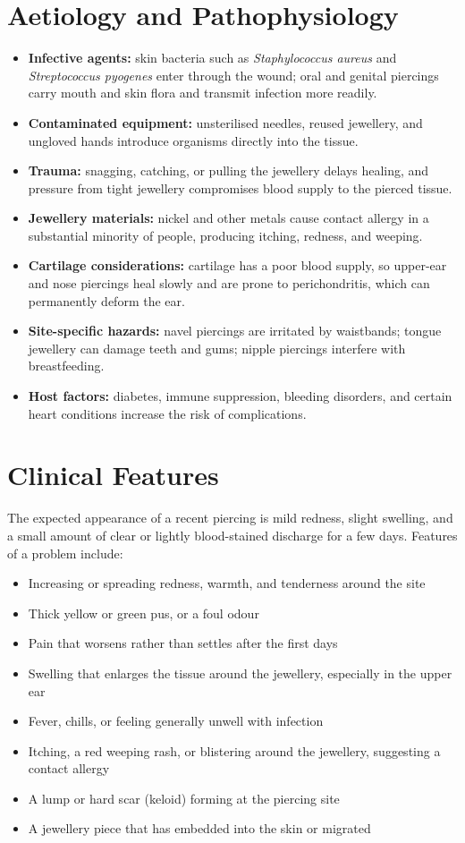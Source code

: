 \section*{Aetiology and Pathophysiology}
\begin{itemize}
    \item \textbf{Infective agents:} skin bacteria such as \textit{Staphylococcus aureus} and \textit{Streptococcus pyogenes} enter through the wound; oral and genital piercings carry mouth and skin flora and transmit infection more readily.
    \item \textbf{Contaminated equipment:} unsterilised needles, reused jewellery, and ungloved hands introduce organisms directly into the tissue.
    \item \textbf{Trauma:} snagging, catching, or pulling the jewellery delays healing, and pressure from tight jewellery compromises blood supply to the pierced tissue.
    \item \textbf{Jewellery materials:} nickel and other metals cause contact allergy in a substantial minority of people, producing itching, redness, and weeping.
    \item \textbf{Cartilage considerations:} cartilage has a poor blood supply, so upper-ear and nose piercings heal slowly and are prone to perichondritis, which can permanently deform the ear.
    \item \textbf{Site-specific hazards:} navel piercings are irritated by waistbands; tongue jewellery can damage teeth and gums; nipple piercings interfere with breastfeeding.
    \item \textbf{Host factors:} diabetes, immune suppression, bleeding disorders, and certain heart conditions increase the risk of complications.
\end{itemize}

\section*{Clinical Features}
The expected appearance of a recent piercing is mild redness, slight swelling, and a small amount of clear or lightly blood-stained discharge for a few days. Features of a problem include:
\begin{itemize}
    \item Increasing or spreading redness, warmth, and tenderness around the site
    \item Thick yellow or green pus, or a foul odour
    \item Pain that worsens rather than settles after the first days
    \item Swelling that enlarges the tissue around the jewellery, especially in the upper ear
    \item Fever, chills, or feeling generally unwell with infection
    \item Itching, a red weeping rash, or blistering around the jewellery, suggesting a contact allergy
    \item A lump or hard scar (keloid) forming at the piercing site
    \item A jewellery piece that has embedded into the skin or migrated
\end{itemize}


